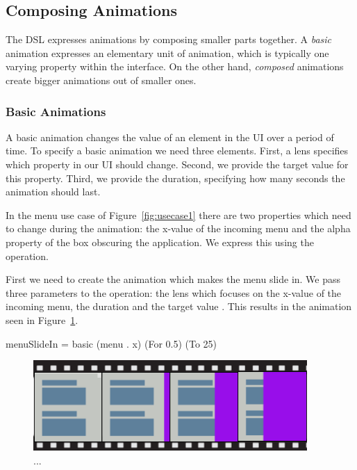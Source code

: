\subsection{Composing Animations}

The DSL expresses animations by composing smaller parts together. A \emph{basic} animation expresses an elementary unit of animation, which is typically one varying property within the interface. On the other hand, \emph{composed} animations create bigger animations out of smaller ones.

\subsubsection{Basic Animations}

A basic animation changes the value of an element in the UI over a period of time. To specify a basic animation we need three elements. First, a lens specifies which property in our UI should change. Second, we provide the target value for this property. Third, we provide the duration, specifying how many seconds the animation should last.

In the menu use case of Figure~\ref{fig:usecase1} there are two properties which need to change during the animation: the x-value of the incoming menu and the alpha property of the box obscuring the application. We express this using the  operation.

First we need to create the animation which makes the menu slide in. We pass three parameters to the  operation: the lens  which focuses on the x-value of the incoming menu, the duration  and the target value . This results in the animation seen in Figure~\ref{fig:usecase1basic1}.

\begin{code}
menuSlideIn = basic (menu . x) (For 0.5) (To 25)
\end{code}

\begin{figure}[H]
\centering
\includegraphics[scale=0.4]{pictures/usecase1basic1.png}
\caption{...}
\label{fig:usecase1basic1}
\end{figure}

